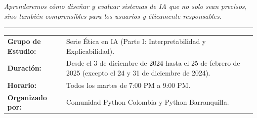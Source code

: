 \begin{titlepage}
\begin{center}
\begin{center}
    {\large \textit{Aprenderemos cómo diseñar y evaluar sistemas de IA que no solo sean precisos, sino también comprensibles para los usuarios y éticamente responsables.}}
\end{center}
\vspace*{\fill}

\noindent
\rule{\textwidth}{0.4pt} %
\vspace{5pt}
\begin{tabular}{lp{12cm}}
    \textbf{Grupo de Estudio:} & Serie Ética en IA (Parte I: Interpretabilidad y Explicabilidad). \\[5pt]
    \textbf{Duración:} & Desde el 3 de diciembre de 2024 hasta el 25 de febrero de 2025 (excepto el 24 y 31 de diciembre de 2024). \\[5pt]
    \textbf{Horario:} & Todos los martes de 7:00 PM a 9:00 PM. \\[5pt]
    \textbf{Organizado por:} & Comunidad Python Colombia y Python Barranquilla. \\[5pt]
\end{tabular}


\bigskip
\bigskip


\end{center}


\end{titlepage}
